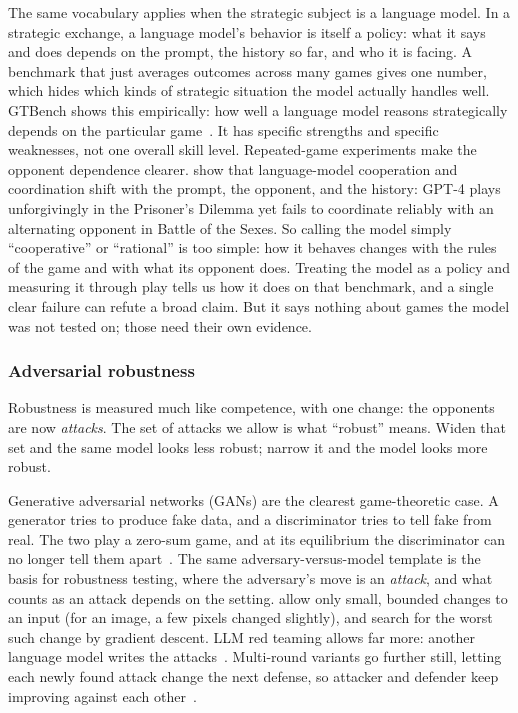  The same vocabulary applies when the strategic subject
is a language model. In a strategic exchange, a language model's behavior is itself a
policy: what it says and does depends on the prompt, the history so far, and who it
is facing. A benchmark that just averages outcomes across many games gives one
number, which hides which kinds of strategic situation the model actually handles
well. GTBench shows this empirically: how well a language model reasons strategically
depends on the particular game~\citep{GTBench2024}. It has specific strengths and
specific weaknesses, not one overall skill level. Repeated-game experiments
make the opponent dependence clearer. \citet{Akata2025} show that language-model
cooperation and coordination shift with the prompt, the opponent, and the history:
GPT-4 plays unforgivingly in the Prisoner's Dilemma yet fails to coordinate reliably
with an alternating opponent in Battle of the Sexes. So calling the model simply ``cooperative'' or ``rational'' is too simple: how it
behaves changes with the rules of the game and with what its opponent does. Treating
the model as a policy and measuring it through play tells us how it does on that
benchmark, and a single clear failure can refute a broad claim. But it says nothing about games the model was not tested on; those need their own
evidence.

\subsubsection{Adversarial robustness}

Robustness is measured much like competence, with one change: the opponents are now
\emph{attacks}. The set of attacks we allow is what ``robust'' means. Widen that set
and the same model looks less robust; narrow it and the model looks more robust.

Generative adversarial networks (GANs) are the clearest game-theoretic case. A generator
tries to produce fake data, and a discriminator tries to tell fake from real. The two
play a zero-sum game, and at its equilibrium the discriminator can no longer tell them
apart~\citep{Goodfellow2014}. The same adversary-versus-model template is the basis for robustness testing, where the adversary's move is an \emph{attack}, and what counts as an attack depends
on the setting.
\citet{Madry2018} allow only small, bounded changes to an input (for an image, a few pixels
changed slightly), and search for the worst such change by gradient descent. LLM red
teaming allows far more: another language model writes the
attacks~\citep{Perez2022}. Multi-round variants go further still, letting each newly
found attack change the next defense, so attacker and defender keep improving against
each other~\citep{MaYang2024RTG}.


